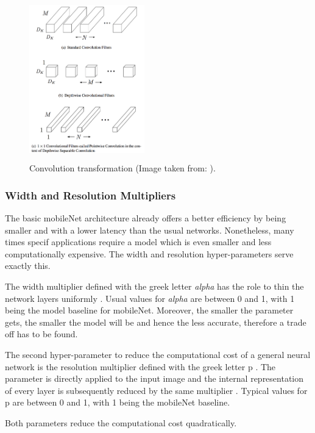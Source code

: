 \begin{figure}[!htbp]
\begin{center}
\includegraphics[width=5cm,height=7cm,keepaspectratio]{images/convolutions.png}
\end{center}
\caption{Convolution transformation (Image taken from: \cite{paper:MobileNets}).}
\end{figure}

\subsubsection{Width and Resolution Multipliers}

The basic mobileNet architecture already offers a better efficiency by being smaller and with a lower latency than the usual networks. Nonetheless, many times specif applications require a model which is even smaller and less computationally expensive. The width and resolution hyper-parameters serve exactly this.

The width multiplier defined with the greek letter \textit{alpha} has the role to thin the network layers uniformly \cite{paper:MobileNets}. Usual values for \textit{alpha} are between 0 and 1, with 1 being the model baseline for mobileNet. Moreover, the smaller the parameter gets, the smaller the model will be and hence the less accurate, therefore a trade off has to be found.

The second hyper-parameter to reduce the computational cost of a general neural network is the resolution multiplier defined with the greek letter p \cite{paper:MobileNets}. The parameter is directly applied to the input image and the internal representation of every layer is subsequently reduced by the same multiplier \cite{paper:MobileNets}. Typical values for p are between 0 and 1, with 1 being the mobileNet baseline.

Both parameters reduce the computational cost quadratically.

